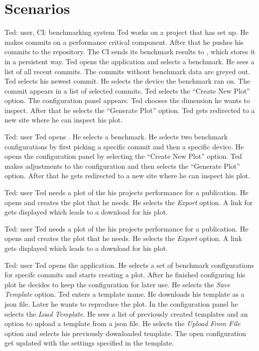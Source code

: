 \section{Scenarios}

{Ted: \Gls{user}, CI: \Gls{benchmarking system}}
{Ted works on a project that has \parkview{} set up. He makes commits on a performance critical component. After that he pushes his commits to the repository. The CI sends its \glspl{benchmark result} to \parkview{}, which stores it in a persistent way. Ted opens the application and selects a \gls{benchmark}. He sees a list of all recent commits. The commits without \gls{benchmark data} are greyed out. Ted selects his newest commit. He selects the device the benchmark ran on. The commit appears in a list of selected commits. Ted selects the \enquote{Create New Plot} option. The configuration panel appears. Ted chooses the dimension he wants to inspect. After that he selects the \enquote{Generate Plot} option. Ted gets redirected to a new site where he can inspect his plot.} 

{Ted: \Gls{user}}
{Ted opens \parkview{}. He selects a \gls{benchmark}. He selects two \glspl{benchmark configuration} by first picking a specific commit and then a specific device. He opens the \gls{configuration panel} by selecting the \enquote{Create New Plot} option. Ted makes adjustments to the \gls{configuration} and then selects the \enquote{Generate Plot} option. After that he gets redirected to a new site where he can inspect his plot.}

{Ted: \Gls{user}}
{Ted needs a \gls{plot} of the his projects performance for a publication. He opens \parkview{} and creates the plot that he needs. He selects the \emph{Export} option. A link for gets displayed which leads to a download for his plot.}

{Ted: \Gls{user}}
{Ted needs a \gls{plot} of the his projects performance for a publication. He opens \parkview{} and creates the plot that he needs. He selects the \emph{Export} option. A link gets displayed which leads to a download for his plot.}

{Ted: \Gls{user}}
{Ted opens the application. He selects a set of \glspl{benchmark configuration} for specifc commits and starts creating a \gls{plot}. After he finished configuring his \gls{plot} he decides to keep the \gls{configuration} for later use. He selects the \emph{Save Template} option. Ted enters a template name. He downloads his template as a \gls{json} file. Later he wants to reproduce the \gls{plot}. In the configuration panel he selects the \emph{Load Template}. He sees a list of previously created templates and an option to upload a \gls{template} from a \gls{json} file. He selects the \emph{Upload From File} option and selects his previously downloaded \gls{template}. The open \gls{configuration} get updated with the settings specified in the \gls{template}.}

